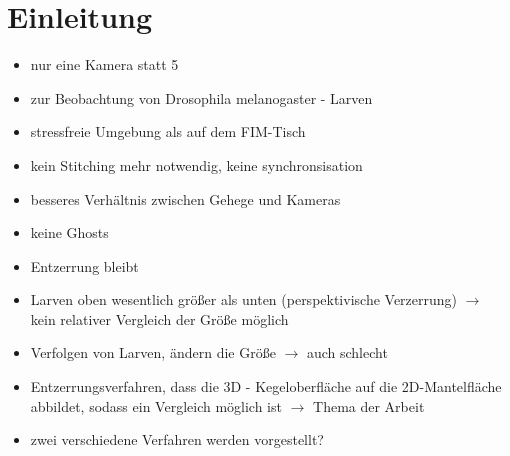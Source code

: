 \chapter{Einleitung}
\begin{itemize}
	\item nur eine Kamera statt 5
	\item zur Beobachtung von Drosophila melanogaster - Larven
	\item stressfreie Umgebung als auf dem FIM-Tisch
	\item kein Stitching mehr notwendig, keine synchronsisation
	\item besseres Verhältnis zwischen Gehege und Kameras
	\item keine Ghosts
	\item Entzerrung bleibt
	\item Larven oben wesentlich größer als unten (perspektivische Verzerrung) $\rightarrow$ kein relativer Vergleich der Größe möglich
	\item Verfolgen von Larven, ändern die Größe $\rightarrow$ auch schlecht
	\item Entzerrungsverfahren, dass die 3D - Kegeloberfläche auf die 2D-Mantelfläche abbildet, sodass ein Vergleich möglich ist $\rightarrow$ Thema der Arbeit
	\item zwei verschiedene Verfahren werden vorgestellt?
\end{itemize}

